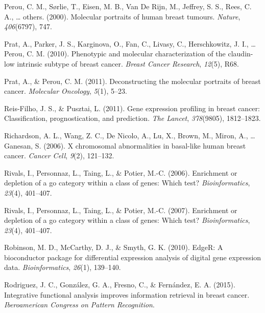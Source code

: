 \documentclass[12pt,twoside]{reedthesis}
\begin{document}
\leavevmode\hypertarget{ref-perou2000molecular}{}%
Perou, C. M., Sørlie, T., Eisen, M. B., Van De Rijn, M., Jeffrey, S. S., Rees, C. A., \ldots{} others. (2000). Molecular portraits of human breast tumours. \emph{Nature}, \emph{406}(6797), 747.

\leavevmode\hypertarget{ref-prat2010phenotypic}{}%
Prat, A., Parker, J. S., Karginova, O., Fan, C., Livasy, C., Herschkowitz, J. I., \ldots{} Perou, C. M. (2010). Phenotypic and molecular characterization of the claudin-low intrinsic subtype of breast cancer. \emph{Breast Cancer Research}, \emph{12}(5), R68.

\leavevmode\hypertarget{ref-prat2011deconstructing}{}%
Prat, A., \& Perou, C. M. (2011). Deconstructing the molecular portraits of breast cancer. \emph{Molecular Oncology}, \emph{5}(1), 5--23.

\leavevmode\hypertarget{ref-reis2011gene}{}%
Reis-Filho, J. S., \& Pusztai, L. (2011). Gene expression profiling in breast cancer: Classification, prognostication, and prediction. \emph{The Lancet}, \emph{378}(9805), 1812--1823.

\leavevmode\hypertarget{ref-richardson2006x}{}%
Richardson, A. L., Wang, Z. C., De Nicolo, A., Lu, X., Brown, M., Miron, A., \ldots{} Ganesan, S. (2006). X chromosomal abnormalities in basal-like human breast cancer. \emph{Cancer Cell}, \emph{9}(2), 121--132.

\leavevmode\hypertarget{ref-rivals2006enrichment}{}%
Rivals, I., Personnaz, L., Taing, L., \& Potier, M.-C. (2006). Enrichment or depletion of a go category within a class of genes: Which test? \emph{Bioinformatics}, \emph{23}(4), 401--407.

\leavevmode\hypertarget{ref-rivals2007enrichment}{}%
Rivals, I., Personnaz, L., Taing, L., \& Potier, M.-C. (2007). Enrichment or depletion of a go category within a class of genes: Which test? \emph{Bioinformatics}, \emph{23}(4), 401--407.

\leavevmode\hypertarget{ref-robinson2010edger}{}%
Robinson, M. D., McCarthy, D. J., \& Smyth, G. K. (2010). EdgeR: A bioconductor package for differential expression analysis of digital gene expression data. \emph{Bioinformatics}, \emph{26}(1), 139--140.

\leavevmode\hypertarget{ref-rodriguezciarp}{}%
Rodriguez, J. C., González, G. A., Fresno, C., \& Fernández, E. A. (2015). Integrative functional analysis improves information retrieval in breast cancer. \emph{Iberoamerican Congress on Pattern Recognition}.
\end{document}
